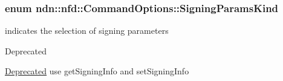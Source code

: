\subsubsection[{\texorpdfstring{Signing\+Params\+Kind}{SigningParamsKind}}]{\setlength{\rightskip}{0pt plus 5cm}enum {\bf ndn\+::nfd\+::\+Command\+Options\+::\+Signing\+Params\+Kind}}\hypertarget{classndn_1_1nfd_1_1CommandOptions_a8ff10b025de45d0451470ccf83af5594}{}\label{classndn_1_1nfd_1_1CommandOptions_a8ff10b025de45d0451470ccf83af5594}


indicates the selection of signing parameters 

\begin{DoxyRefDesc}{Deprecated}
\item[\hyperlink{deprecated__deprecated000018}{Deprecated}]use get\+Signing\+Info and set\+Signing\+Info \end{DoxyRefDesc}
